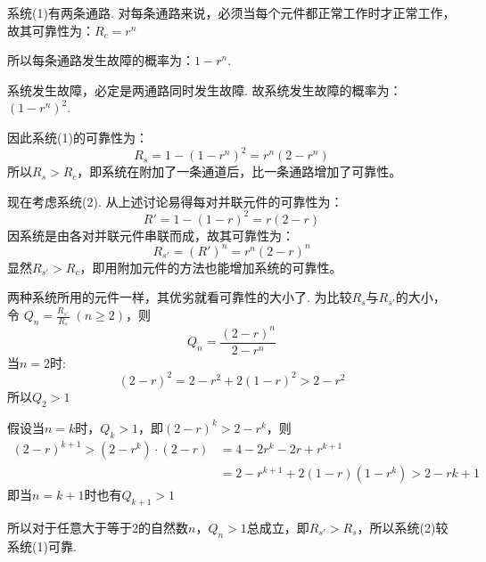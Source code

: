 \begin{solution}
    系统(1)有两条通路. 对每条通路来说，必须当每个元件都正常工作时才正常工作，故其可靠性为：$R_c=r^n$

    所以每条通路发生故障的概率为：$1-r^n$.

    系统发生故障，必定是两通路同时发生故障. 故系统发生故障的概率为：$(1-r^n)^2$.

    因此系统(1)的可靠性为：$$R_s=1-(1-r^n)^2=r^n(2-r^n)$$
    所以$R_s>R_c$，即系统在附加了一条通道后，比一条通路增加了可靠性。

    现在考虑系统(2). 从上述讨论易得每对并联元件的可靠性为：$$R'=1-(1-r)^2=r(2-r)$$
    因系统是由各对并联元件串联而成，故其可靠性为：
\[    R_{s'}=(R')^n=r^n(2-r)^n\]
    显然$R_{s'}>R_c$，即用附加元件的方法也能增加系统的可靠性。

两种系统所用的元件一样，其优劣就看可靠性的大小了. 为比较$R_s$与$R_{s'}$的大小，令
$Q_n=\frac{R_{s'}}{R_s}\; (n\ge 2)$，则
\[Q_n=\frac{(2-r)^n}{2-r^n}\]
当$n=2$时:
\[(2-r)^2=2-r^2+2(1-r)^2>2-r^2\]
所以$Q_2>1$

假设当$n=k$时，$Q_k>1$，即$(2-r)^k>2-r^k$，则
\[\begin{split}
 (2-r)^{k+1}>(2-r^k)\cdot (2-r)&=4-2r^k-2r+r^{k+1}\\
&=2-r^{k+1}+2(1-r)(1-r^k)>2-rk+1   
\end{split}\]
即当$n=k+1$时也有$Q_{k+1}>1$

所以对于任意大于等于2的自然数$n$，$Q_n>1$总成立，即$R_{s'}>R_s$，所以系统(2)较系统(1)可靠.
\end{solution}














